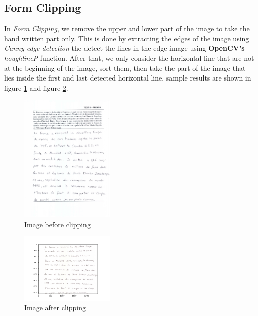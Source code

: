 \subsection{Form Clipping}
In \emph{Form Clipping}, we remove the upper and lower part of the image to take the hand written part only.
This is done by extracting the edges of the image using \emph{Canny edge detection} the detect the lines in the edge image using \textbf{OpenCV's} \emph{houghlineP} function.
After that, we only consider the horizontal line that are not at the beginning of the image, sort them, then take the part of the image that lies inside the first and last detected horizontal line.
sample results are shown in figure \ref{fig:clipping-example} and figure \ref{fig:clipping-result}.

\begin{figure}
    \centering
    \includegraphics[width=0.4\textwidth]{images/5.jpeg}
    \caption{Image before clipping}
    \label{fig:clipping-example}
\end{figure}

\begin{figure}
    \centering
    \includegraphics[width=0.4\textwidth]{images/img5_result.png}
    \caption{Image after clipping}
    \label{fig:clipping-result}
\end{figure}

